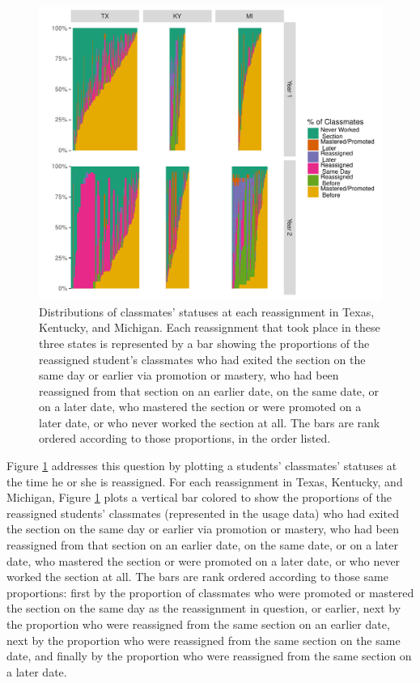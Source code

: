 \documentclass[notitlepage,12pt]{jedm}\usepackage[]{graphicx}\usepackage[]{color}
\makeatletter
\def\maxwidth{ %
  \ifdim\Gin@nat@width>\linewidth
    \linewidth
  \else
    \Gin@nat@width
  \fi
}
\makeatother
\begin{document}
\begin{figure}
  \centering


\includegraphics[width=\maxwidth]{figure/classmates-1} 

\caption{Distributions of classmates' statuses at each reassignment in
  Texas, Kentucky, and Michigan. Each reassignment that took place in
  these three states is represented by a bar showing the proportions of
  the reassigned student's classmates who had exited the section on
  the same day or earlier via promotion or mastery, who had been
  reassigned from that section on an earlier date, on the same date,
  or on a later date, who mastered the section or were promoted on a
  later date, or who never worked the section at all. The bars are
  rank ordered according to those proportions, in the order listed.}
\label{fig:classmates}
\end{figure}

Figure \ref{fig:classmates} addresses this question by plotting a
students' classmates' statuses at the time he or she is reassigned.
For each reassignment in Texas, Kentucky, and Michigan, Figure \ref{fig:classmates}
plots a vertical bar colored to show the proportions of the reassigned
students' classmates (represented in the usage data) who  had exited the section on
the same day or earlier via promotion or mastery, who had been
reassigned from that section on an earlier date, on the same date,
or on a later date, who mastered the section or were promoted on a
later date, or who never worked the section at all.
The bars are rank ordered according to those same proportions: first by the
proportion of classmates who were promoted or mastered the section on
the same day as the reassignment in question, or earlier, next by the
proportion who were reassigned from the same section on an earlier
date, next by the proportion who were reassigned from the same section
on the same date, and finally by the proportion who were reassigned
from the same section on a later date.
\end{document}
